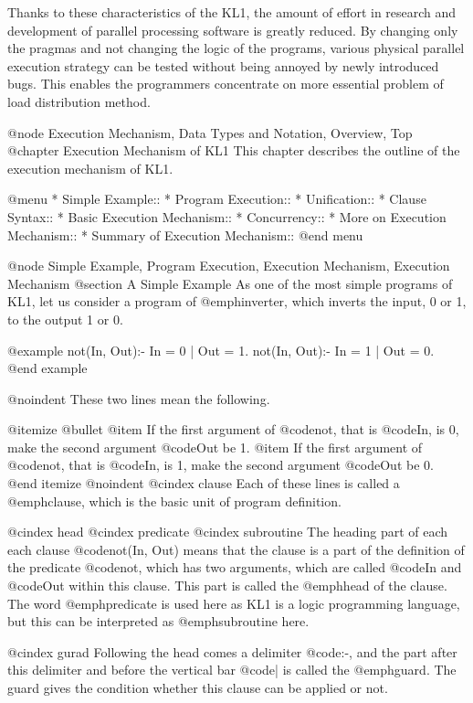 Thanks to these characteristics of the KL1, the amount of effort in
research and development of parallel processing software is greatly
reduced.  By changing only the pragmas and not changing the logic of the
programs, various physical parallel execution strategy can be tested
without being annoyed by newly introduced bugs.  This enables the
programmers concentrate on more essential problem of load distribution
method.

@node Execution Mechanism, Data Types and Notation, Overview, Top
@chapter Execution Mechanism of KL1
This chapter describes the outline of the execution mechanism of KL1.

@menu
* Simple Example::              
* Program Execution::           
* Unification::                 
* Clause Syntax::               
* Basic Execution Mechanism::   
* Concurrency::                 
* More on Execution Mechanism::  
* Summary of Execution Mechanism::  
@end menu

@node Simple Example, Program Execution, Execution Mechanism, Execution Mechanism
@section A Simple Example
As one of the most simple programs of KL1, let us consider a program of
@emph{inverter}, which inverts the input, 0 or 1, to the output 1 or 0.

@example
not(In, Out):- In = 0 | Out = 1.
not(In, Out):- In = 1 | Out = 0.
@end example

@noindent
These two lines mean the following.

@itemize @bullet
@item
If the first argument of @code{not}, that is @code{In}, is 0, make the
second argument @code{Out} be 1.
@item
If the first argument of @code{not}, that is @code{In}, is 1, make the
second argument @code{Out} be 0.
@end itemize
@noindent
@cindex clause
Each of these lines is called a @emph{clause}, which is the basic unit
of program definition.

@cindex head
@cindex predicate
@cindex subroutine
The heading part of each each clause @code{not(In, Out)} means that the
clause is a part of the definition of the predicate @code{not}, which
has two arguments, which are called @code{In} and @code{Out} within this
clause.  This part is called the @emph{head} of the clause.  The word
@emph{predicate} is used here as KL1 is a logic programming language,
but this can be interpreted as @emph{subroutine} here.

@cindex gurad
Following the head comes a delimiter @code{:-}, and the part after this
delimiter and before the vertical bar @code{|} is called the
@emph{guard}.  The guard gives the condition whether this clause can be
applied or not.

